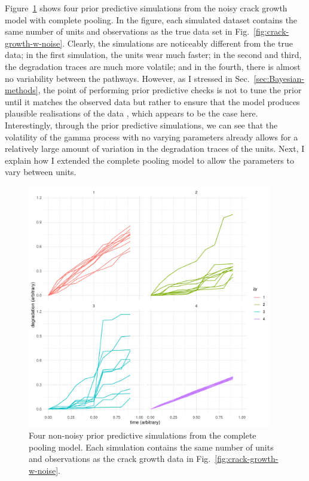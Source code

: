 Figure~\ref{fig:ppc-multi-unit} shows four prior predictive simulations from the noisy crack growth model with complete pooling. In the figure, each simulated dataset contains the same number of units and observations as the true data set in Fig.~\ref{fig:crack-growth-w-noise}. Clearly, the simulations are noticeably different from the true data; in the first simulation, the units wear much faster; in the second and third, the degradation traces are much more volatile; and in the fourth, there is almost no variability between the pathways. However, as I stressed in Sec.~\ref{sec:Bayesian-methods}, the point of performing prior predictive checks is not to tune the prior until it matches the observed data but rather to ensure that the model produces plausible realisations of the data \citep{gabry_vis_2019}, which appears to be the case here. Interestingly, through the prior predictive simulations, we can see that the volatility of the gamma process with no varying parameters already allows for a relatively large amount of variation in the degradation traces of the units. Next, I explain how I extended the complete pooling model to allow the parameters to vary between units.

\begin{figure}
   \centering
   \includegraphics[width=0.95\textwidth]{./figures/ch-5/PPC_multi_unit.pdf}
   \caption{Four non-noisy prior predictive simulations from the complete pooling model. Each simulation contains the same number of units and observations as the crack growth data in Fig.~\ref{fig:crack-growth-w-noise}.}
   \label{fig:ppc-multi-unit} 
\end{figure}

